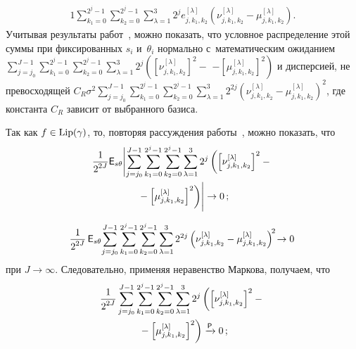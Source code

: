\begin{multicols}{2}
\begin{multline*}
{1}\sum\limits_{k_1=0}^{2^j-1}\sum\limits_{k_2=0}^{2^j-
1}\sum\limits_{\lambda=1}^3 2^j 
e_{j,k_1,k_2}^{[\lambda]}\left(\nu_{j,k_1,k_2}^{[\lambda]}-
\mu_{j,k_1,k_2}^{[\lambda]}\right).
\end{multline*}
Учитывая результаты работ~\cite{CB99, SH19}, можно показать, что условное 
распределение этой суммы при фиксированных $s_i$ и~$\theta_i$ нормально 
с~математическим ожиданием
$\sum\nolimits_{j = j_0}^{J - 1}\sum\nolimits_{k_1=0}^{2^j-1}
\sum\nolimits_{k_2=0}^{2^j-1}\sum\nolimits_{\lambda=1}^3 
2^j\left(\left[\nu_{j,k_1,k_2}^{[\lambda]}\right]^2-\right.$\linebreak
$\left.-\left[\mu_{j,k_1,k_2}^{[\lambda]}\right]^2\right)$
и дисперсией, не превосходящей
$C_{R}\sigma^2\sum\limits_{j = j_0}^{J - 1}\sum\limits_{k_1=0}^{2^j-1}
\sum\limits_{k_2=0}^{2^j-1}\sum\limits_{\lambda=1}^3 
2^{2j}\left(\nu_{j,k_1,k_2}^{[\lambda]}-\mu_{j,k_1,k_2}^{[\lambda]}\right)^2$,
где константа $C_{R}$ зависит от выбранного базиса.

Так как $f\hm\in\mathrm{Lip}(\gamma)$, то, повторяя рассуждения 
работы~\cite{SH19}, можно показать, что
\begin{multline*}
\fr{1}{2^{2J}}{\sf E}_{s\theta}%
{\Biggl\vert\sum\limits_{j = j_0}^{J - 1}
\sum\limits_{k_1=0}^{2^j-1}\sum\limits_{k_2=0}^{2^j-1}
\sum\limits_{\lambda=1}^3 
2^j\left(\left[\nu_{j,k_1,k_2}^{[\lambda]}\right]^2-{}\right.}\\
{\left.{}-\left[\mu_{j,k_1,k_2}^{[\lambda]}\right]^2\right)\Biggr\vert}\to 0\,;
\end{multline*}


\noindent
\begin{equation*}
\!\displaystyle\frac{\displaystyle 1\mathstrut}{\displaystyle 2^{2J}\mathstrut}\,{\sf E}_{s\theta}\!\sum\limits_{j = j_0}^{J - 
1}\sum\limits_{k_1=0}^{2^j-1}\sum\limits_{k_2=0}^{2^j-
1}\sum\limits_{\lambda=1}^3 2^{2j}\left(\nu_{j,k_1,k_2}^{[\lambda]}-
\mu_{j,k_1,k_2}^{[\lambda]}\right)^{\!2}\!\to 0
\end{equation*}
при $J\to\infty$. Следовательно, применяя неравенство Маркова, получаем, 
что
\begin{multline*}
\displaystyle\frac{\displaystyle 1\mathstrut}{\displaystyle 2^{2J}\mathstrut}\sum\limits_{j = j_0}^{J - 1}\sum\limits_{k_1=0}^{2^j-
1}\sum\limits_{k_2=0}^{2^j-1}\sum\limits_{\lambda=1}^3 
2^j\left(\left[\nu_{j,k_1,k_2}^{[\lambda]}\right]^2-{}\right.\\
\left.{}-
\left[\mu_{j,k_1,k_2}^{[\lambda]}\right]^2\right)\xrightarrow{\sf P} 0\,;
\end{multline*}


\end{multicols}
